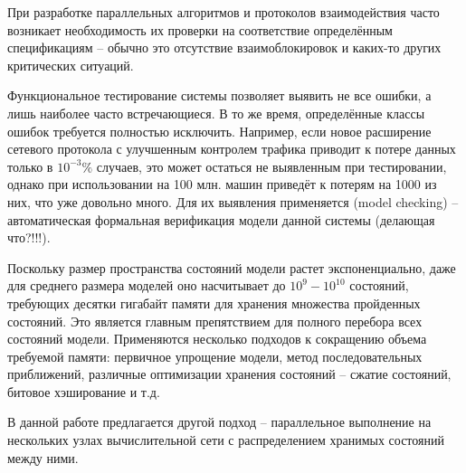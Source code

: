 \Introduction

При разработке параллельных алгоритмов и протоколов взаимодействия часто возникает
необходимость их проверки на соответствие определённым спецификациям -- обычно это
отсутствие взаимоблокировок и каких-то других критических ситуаций.

Функциональное тестирование системы позволяет выявить не все ошибки, а лишь наиболее часто
встречающиеся. В то же время, определённые классы ошибок требуется полностью
исключить. Например, если новое расширение сетевого протокола с улучшенным контролем
трафика приводит к потере данных только в $10^{-3}\%$ случаев, это может остаться не
выявленным при тестировании, однако при использовании на 100 млн. машин приведёт к потерям
на 1000 из них, что уже довольно много. Для их выявления применяется 
(model checking) -- автоматическая формальная верификация модели данной системы (делающая что?!!!).

Поскольку размер пространства состояний модели растет экспоненциально, даже для среднего
размера моделей оно насчитывает до $10^9 - 10^{10}$ состояний, требующих десятки гигабайт
памяти для хранения множества пройденных состояний. Это является главным препятствием для
полного перебора всех состояний модели. Применяются несколько подходов к сокращению объема
требуемой памяти: первичное упрощение модели, метод последовательных приближений,
различные оптимизации хранения состояний -- сжатие состояний, битовое хэширование и т.д. 

В данной работе предлагается другой подход -- параллельное выполнение на нескольких узлах
вычислительной сети с распределением хранимых состояний между ними.


